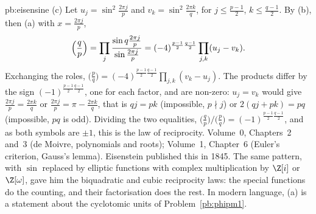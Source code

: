 \begin{solution}{pb:eisensine}
(c) Let $u_j=\sin^2\frac{2\pi j}p$ and $v_k=\sin^2\frac{2\pi k}q$, for $j\le\frac{p-1}2$, $k\le\frac{q-1}2$. By (b), then (a) with
$x=\frac{2\pi j}p$,
\[
\Bigl(\frac qp\Bigr)=\prod_j\frac{\sin q\frac{2\pi j}p}{\sin\frac{2\pi j}p}=(-4)^{\frac{p-1}2\frac{q-1}2}\prod_{j,k}(u_j-v_k).
\]
Exchanging the roles, $\bigl(\frac pq\bigr)=(-4)^{\frac{p-1}2\frac{q-1}2}\prod_{j,k}(v_k-u_j)$. The products differ by the sign
$(-1)^{\frac{p-1}2\frac{q-1}2}$, one for each factor, and are non-zero: $u_j=v_k$ would give $\frac{2\pi j}p=\frac{2\pi k}q$ or
$\frac{2\pi j}p=\pi-\frac{2\pi k}q$, that is $qj=pk$ (impossible, $p\nmid j$) or $2(qj+pk)=pq$ (impossible, $pq$ is odd).
Dividing the two equalities, $\bigl(\frac qp\bigr)\big/\bigl(\frac pq\bigr)=(-1)^{\frac{p-1}2\frac{q-1}2}$, and as both symbols
are $\pm1$, this is the law of reciprocity.
\tools Volume~0, Chapters~2 and~3 (de Moivre, polynomials and roots); Volume~1, Chapter~6 (Euler's criterion, Gauss's lemma).
\leads Eisenstein published this in 1845. The same pattern, with $\sin$ replaced by elliptic functions with complex
multiplication by $\Z[i]$ or $\Z[\omega]$, gave him the biquadratic and cubic reciprocity laws: the special functions do the
counting, and their factorisation does the rest. In modern language, (a) is a statement about the cyclotomic units of
Problem~\ref{pb:phipm1}.
\end{solution}

